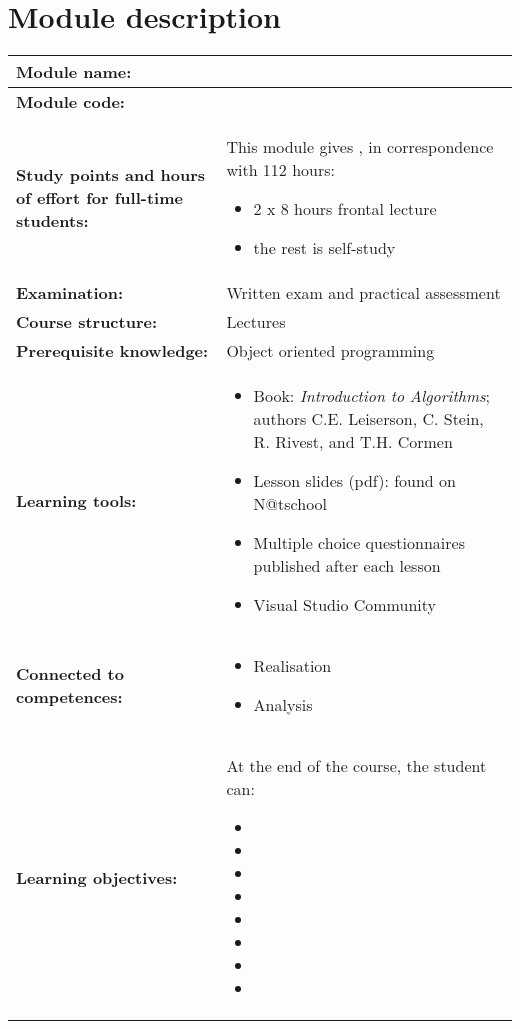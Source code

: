 \section*{Module description}
\begin{tabularx}{\textwidth}{|>{\columncolor{lichtGrijs}} p{}|X|}
	\hline
	\textbf{Module name:} & \modulenaam\\
	\hline
	\textbf{Module code: }& \modulecode\\
	\hline
	\textbf{Study points \newline and hours of effort for full-time students:} & This module gives \stdPunten, in correspondence with 112 hours:
	\begin{itemize}
		\item 2 x 8 hours frontal lecture
		\item the rest is self-study
	\end{itemize} \\
	\hline
	\textbf{Examination:} & Written exam and practical assessment \\
	\hline
	\textbf{Course structure:} & Lectures \\
	\hline
	\textbf{Prerequisite knowledge:} & Object oriented programming \\
	\hline
	\textbf{Learning tools:} & \begin{itemize}
			\item Book: \textit{Introduction to Algorithms}; authors
			C.E. Leiserson, C. Stein, R. Rivest, and T.H. Cormen
			\item Lesson slides (pdf): found on N@tschool
			\item Multiple choice questionnaires published after each lesson
			\item Visual Studio Community
		\end{itemize} \\
	\hline
	\textbf{Connected to \newline competences:} & \begin{itemize}
			\item Realisation
			\item Analysis
		\end{itemize} \\
	\hline
	\textbf{Learning objectives:} &
		At the end of the course, the student can:
			\begin{itemize}
				\item \lga
				\item \lgb
				\item \lgc
				\item \lgd
				\item \lge 
				\item \lgf
				\item \lgg
				\item \lgh
			\end{itemize} \\
	\hline


\end{tabularx}

